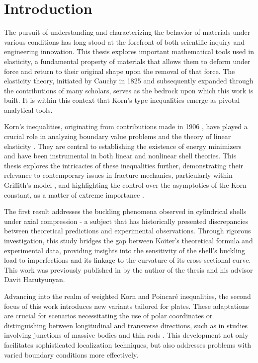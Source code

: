 \chapter{Introduction}
\label{chap:intro}

The pursuit of understanding and characterizing the behavior of materials under various conditions has long stood at the forefront of both scientific inquiry and engineering innovation. This thesis explores important mathematical tools used in elasticity, a fundamental property of materials that allows them to deform under force and return to their original shape upon the removal of that force. The elasticity theory, initiated by Cauchy in 1825 and subsequently expanded through the contributions of many scholars, serves as the bedrock upon which this work is built. It is within this context that Korn's type inequalities emerge as pivotal analytical tools.

Korn's inequalities, originating from contributions made in 1906 \cite{Korn1, Korn2,KohnThesis}, have played a crucial role in analyzing boundary value problems and the theory of linear elasticity \cite{bib:Horgan}. They are central to establishing the existence of energy minimizers and have been instrumental in both linear and nonlinear shell theories. This thesis explores the intricacies of these inequalities further, demonstrating their relevance to contemporary issues in fracture mechanics, particularly within Griffith's model \cite{FracGrif, FracBook, Frac2, Frac3}, and highlighting the control over the asymptotics of the Korn constant, as a matter of extreme importance  \cite{bib:Gra.Tru.,bib:Gra.Har.2, bib:Gra.Har.3,bib:Harutyunyan.3}.

The first result addresses the buckling phenomena observed in cylindrical shells under axial compression - a subject that has historically presented discrepancies between theoretical predictions and experimental observations. Through rigorous investigation, this study bridges the gap between Koiter's theoretical formula \cite{bib:Koiter,bib:Lorenz,bib:Timoshenko,bib:Tim.Woi.} and experimental data, providing insights into the sensitivity of the shell's buckling load to imperfections and its linkage to the curvature of its cross-sectional curve. This work was previously published in \cite{andre} by the author of the thesis and his advisor Davit Harutyunyan.

Advancing into the realm of weighted Korn and Poincaré inequalities, the second focus of this work introduces new variants tailored for plates. These adaptations are crucial for scenarios necessitating the use of polar coordinates or distinguishing between longitudinal and transverse directions, such as in studies involving junctions of massive bodies and thin rods \cite{wKorn1,wKorn2,wKorn3,surveyQuasilinearSystems}. This development not only facilitates sophisticated localization techniques, but also addresses problems with varied boundary conditions more effectively.


